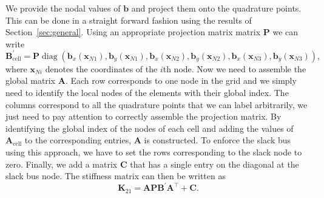 \documentclass[aps,pre]{revtex4-2}
\DeclareMathOperator{\diag}{diag}
\begin{document}
We provide the nodal values of $\bm{b}$ and project them onto the quadrature points.
This can be done in a straight forward fashion using the results of Section~\ref{sec:general}.
Using an appropriate projection matrix matrix $\bm{P}$ we can write
\begin{equation}
    \bm{B}^\prime_\mathrm{cell} = \bm{P}\diag\left(\bm{b}_x(\bm{x}_{N1}),\bm{b}_y(\bm{x}_{N1}),\bm{b}_x(\bm{x}_{N2}),\bm{b}_y(\bm{x}_{N2}),\bm{b}_x(\bm{x}_{N3}),\bm{b}_y(\bm{x}_{N3})\right),
\end{equation}
where $\bm{x}_{Ni}$ denotes the coordinates of the $i$th node.
Now we need to assemble the global matrix $\bm{A}$.
Each row corresponds to one node in the grid and we simply need to identify the local nodes of the elements with their global index.
The columns correspond to all the quadrature points that we can label arbitrarily, we just need to pay attention to correctly assemble the projection matrix.
By identifying the global index of the nodes of each cell and adding the values of $\bm{A}_\mathrm{cell}$ to the corresponding entries, $\bm{A}$ is constructed. 
To enforce the slack bus using this approach, we have to set the rows corresponding to the slack node to zero.
Finally, we add a matrix $\bm{C}$ that has a single entry on the diagonal at the slack bus node.
The stiffness matrix can then be written as
\begin{equation}
    \bm{K}_{21} = \bm{A}\bm{P}\bm{B}^\prime\bm{A}^\top + \bm{C}.
\end{equation}



\end{document}
